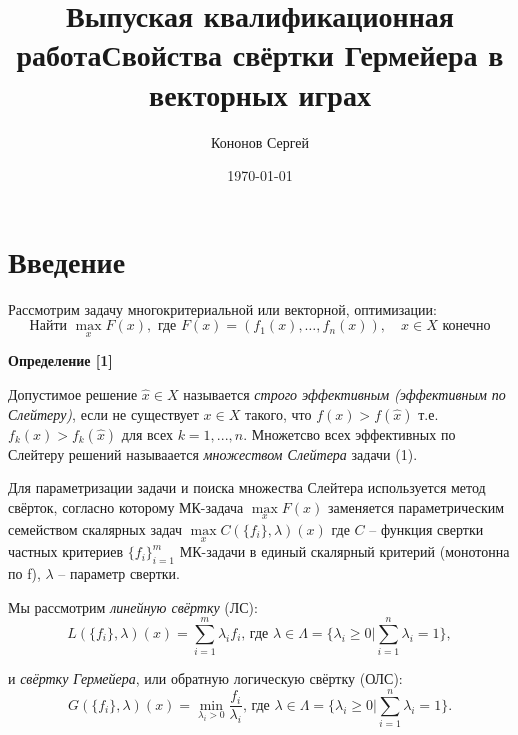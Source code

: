 \documentclass[letterpaper,12pt, reqno]{article}
\begin{document}
\title{Выпуская квалификационная работа}
\title{Свойства свёртки Гермейера в векторных играх }
\author{Кононов Сергей}
\date{\today}
\maketitle

\clearpage
\tableofcontents
\clearpage


\section{Введение}
\begin{flushleft}

Рассмотрим задачу многокритериальной или векторной, оптимизации:
\begin{equation}
\textrm{Найти }\max\limits_x F(x), \textrm{ где } F(x)=({f}_1(x),\ldots, {f}_n(x)),\quad x\in X\textrm{ конечно}
\end{equation}


\textbf{Определение [1]} 

Допустимое решение $\hat{x}\in{X}$ называется \textit{строго эффективным (эффективным по Слейтеру)}, если не существует
$x\in{X}$ такого, что $f(x)>f(\hat{x})$ т.е. $f_k(x)>f_k(\hat{x})$ для всех $k=1,...,n$. Множетсво всех эффективных по
Слейтеру решений называается \textit{множеством Слейтера} задачи (1).
\vspace{5mm}

Для параметризации задачи и поиска множества Слейтера используется метод свёрток, согласно которому МК-задача
$\max\limits_x F(x)$ заменяется параметрическим семейством скалярных задач $\max\limits_x C(\{f_i\}, \lambda)(x)$
где $C$ – функция свертки частных критериев $\{f_i\}_{i=1}^m$ МК-задачи в единый скалярный критерий (монотонна по f), 
$\lambda$ – параметр свертки. 
\vspace{5mm}

Мы рассмотрим \textit{линейную свёртку} (ЛС):
\begin{equation}
L(\{f_i\}, \lambda)(x)=\sum_{i=1}^{m} \lambda_i f_i \textrm{, где }
\lambda \in \Lambda =\{\lambda_i \geq 0 | \sum_{i=1}^n \lambda_i =1 \},
\end{equation}

и \textit{свёртку Гермейера}, или обратную логическую свёртку (ОЛС):
\begin{equation}
G(\{f_i\}, \lambda)(x)=\min\limits_{\lambda_i > 0} \frac{f_i}{\lambda_i} \textrm{, где }
\lambda \in \Lambda =\{\lambda_i \geq 0 | \sum_{i=1}^n \lambda_i =1 \}.
\end{equation}


\end{flushleft}
\end{document}
